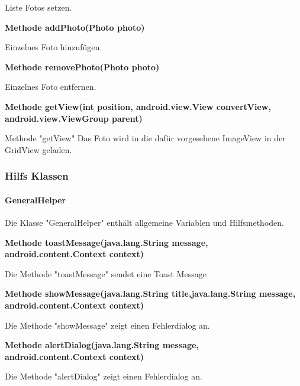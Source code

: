 \documentclass{scrartcl}
\begin{document}
\noindent Liste Fotos setzen. \newline 

\noindent\textbf{Methode addPhoto(Photo photo)}

\noindent Einzelnes Foto hinzufügen. \newline 

\noindent\textbf{Methode removePhoto(Photo photo)}

\noindent Einzelnes Foto entfernen. \newline 

\noindent\textbf{Methode getView(int position, \newline                              android.view.View convertView, android.view.ViewGroup parent)}

\noindent Methode "getView" Das Foto wird in die dafür vorgesehene ImageView in der GridView geladen. \newline 

\newpage

\subsubsection{Hilfs Klassen}

\paragraph{GeneralHelper}
Die Klasse "GeneralHelper" enthält allgemeine Variablen und Hilfsmethoden. \newline 

\noindent\textbf{Methode toastMessage(java.lang.String message, \newline                   android.content.Context context)}

\noindent Die Methode "toastMessage" sendet eine Toast Message \newline

\noindent\textbf{Methode showMessage(java.lang.String title,\newline  java.lang.String message, android.content.Context context)}

\noindent Die Methode "showMessage" zeigt einen Fehlerdialog an. \newline

\noindent\textbf{Methode alertDialog(java.lang.String message, \newline  android.content.Context context)}

\noindent Die Methode "alertDialog" zeigt einen Fehlerdialog an. \newline
\end{document}
